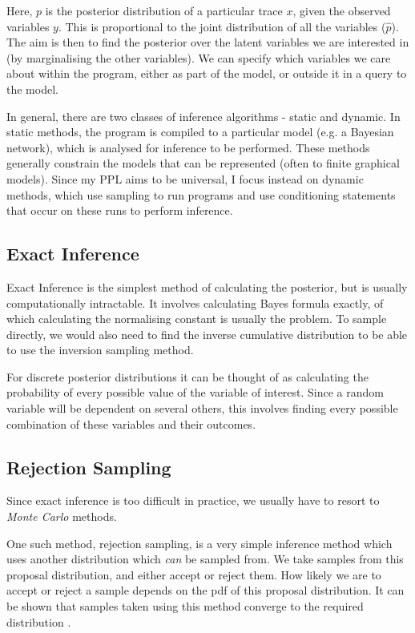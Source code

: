 Here, $p$ is the posterior distribution of a particular trace $x$, given the observed variables $y$. This is proportional to the joint distribution of all the variables ($\hat{p}$). The aim is then to find the posterior over the latent variables we are interested in (by marginalising the other variables). We can specify which variables we care about within the program, either as part of the model, or outside it in a query to the model.
	
In general, there are two classes of inference algorithms - static and dynamic\cite{gordon2014probabilistic}. In static methods, the program is compiled to a particular model (e.g. a Bayesian network), which is analysed for inference to be performed. These methods generally constrain the models that can be represented (often to finite graphical models). Since my PPL aims to be universal, I focus instead on dynamic methods, which use sampling to run programs and use conditioning statements that occur on these runs to perform inference.
	
\subsection{Exact Inference}
	
Exact Inference is the simplest method of calculating the posterior, but is usually computationally intractable. It involves calculating Bayes formula exactly, of which calculating the normalising constant is usually the problem. To sample directly, we would also need to find the inverse cumulative distribution to be able to use the inversion sampling method.
	
For discrete posterior distributions it can be thought of as calculating the probability of every possible value of the variable of interest. Since a random variable will be dependent on several others, this involves finding every possible combination of these variables and their outcomes.

\subsection{Rejection Sampling}
	
Since exact inference is too difficult in practice, we usually have to resort to \textit{Monte Carlo} \cite{monte-carlo} methods.
	
One such method, rejection sampling, is a very simple inference method which uses another distribution which \textit{can} be sampled from. We take samples from this proposal distribution, and either accept or reject them. How likely we are to accept or reject a sample depends on the pdf of this proposal distribution. It can be shown that samples taken using this method converge to the required distribution \cite{flury1990acceptance}. 
	
